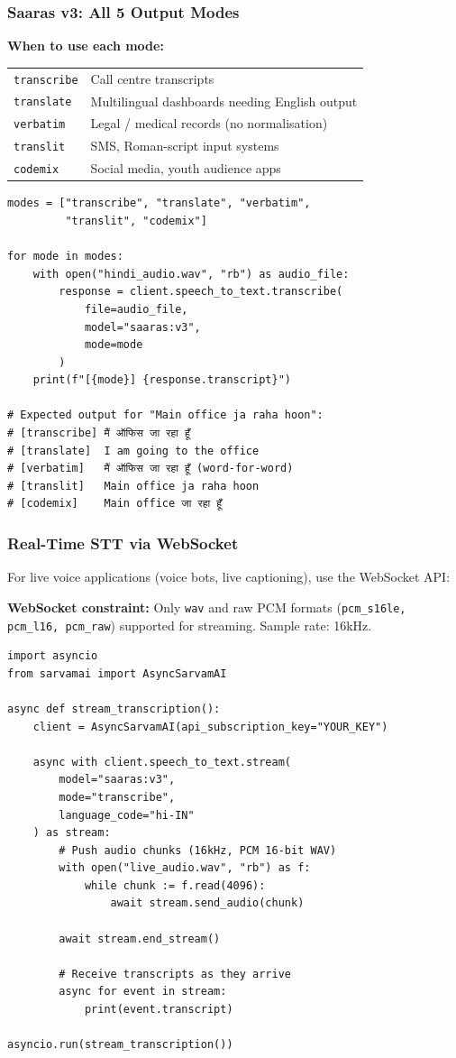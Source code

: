 \begin{frame}[fragile]\frametitle{Saaras v3: All 5 Output Modes}
\textbf{When to use each mode:}
\begin{center}
\begin{tabular}{ll}
\texttt{transcribe} & Call centre transcripts \\
\texttt{translate} & Multilingual dashboards needing English output \\
\texttt{verbatim} & Legal / medical records (no normalisation) \\
\texttt{translit} & SMS, Roman-script input systems \\
\texttt{codemix} & Social media, youth audience apps \\
\end{tabular}
\end{center}
\begin{lstlisting}
modes = ["transcribe", "translate", "verbatim",
         "translit", "codemix"]

for mode in modes:
    with open("hindi_audio.wav", "rb") as audio_file:
        response = client.speech_to_text.transcribe(
            file=audio_file,
            model="saaras:v3",
            mode=mode
        )
    print(f"[{mode}] {response.transcript}")

# Expected output for "Main office ja raha hoon":
# [transcribe] मैं ऑफिस जा रहा हूँ
# [translate]  I am going to the office
# [verbatim]   मैं ऑफिस जा रहा हूँ (word-for-word)
# [translit]   Main office ja raha hoon
# [codemix]    Main office जा रहा हूँ
\end{lstlisting}
\end{frame}

\begin{frame}[fragile]\frametitle{Real-Time STT via WebSocket}
For live voice applications (voice bots, live captioning), use the WebSocket API:

\textbf{WebSocket constraint:} Only \texttt{wav} and raw PCM formats (\texttt{pcm\_s16le, pcm\_l16, pcm\_raw}) supported for streaming. Sample rate: 16kHz.
\begin{lstlisting}
import asyncio
from sarvamai import AsyncSarvamAI

async def stream_transcription():
    client = AsyncSarvamAI(api_subscription_key="YOUR_KEY")

    async with client.speech_to_text.stream(
        model="saaras:v3",
        mode="transcribe",
        language_code="hi-IN"
    ) as stream:
        # Push audio chunks (16kHz, PCM 16-bit WAV)
        with open("live_audio.wav", "rb") as f:
            while chunk := f.read(4096):
                await stream.send_audio(chunk)

        await stream.end_stream()

        # Receive transcripts as they arrive
        async for event in stream:
            print(event.transcript)

asyncio.run(stream_transcription())
\end{lstlisting}
\end{frame}


